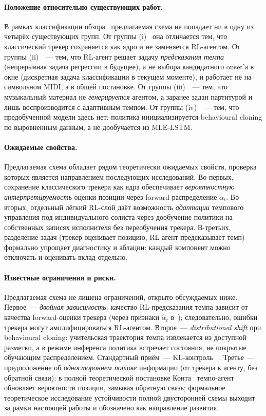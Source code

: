 \paragraph*{Положение относительно существующих работ.} В
рамках классификации обзора~ предлагаемая схема
не попадает ни в одну из четырёх существующих групп. От группы
(i)~\cite{Dorfer2018RL} она отличается тем, что классический
трекер сохраняется как ядро и не заменяется RL-агентом. От
группы (ii)~\cite{Peter2023}~--- тем, что RL-агент решает задачу
\textit{предсказания темпа} (непрерывная задача регрессии в
будущее), а не выбора кандидатного onset’а в окне (дискретная
задача классификации в текущем моменте), и работает не на
символьном MIDI, а в общей постановке. От группы
(iii)~\cite{Jiang2020RLDuet,Wu2024ReaLchords}~--- тем, что
музыкальный материал не \textit{генерируется} агентом, а
заранее задан партитурой и лишь воспроизводится с
адаптивным темпом. От группы (iv)~\cite{Jaques2017SeqTutor}~---
тем, что предобученной модели здесь нет: политика инициализируется
behavioural cloning по выровненным
данным, а не дообучается из MLE-LSTM.

\paragraph*{Ожидаемые свойства.} Предлагаемая схема обладает
рядом теоретически ожидаемых свойств, проверка которых
является направлением последующих исследований. Во-первых,
сохранение классического трекера как ядра обеспечивает
\textit{вероятностную интерпретируемость} оценки позиции через
forward-распределение $\tilde\alpha_t$. Во-вторых, отдельный
лёгкий RL-слой даёт возможность \textit{адаптации} темпового
управления под индивидуального солиста через дообучение
политики на собственных записях исполнителя без
переобучения трекера. В-третьих, разделение задач (трекер
оценивает позицию, RL-агент предсказывает темп) формально
упрощает диагностику и аблации: каждый компонент можно
отключать и оценивать вклад отдельно.

\paragraph*{Известные ограничения и риски.} Предлагаемая схема
не лишена ограничений, открыто обсуждаемых ниже. Первое~---
\textit{двойная зависимость}: качество RL-предсказания темпа
зависит от качества forward-оценки трекера (через признаки
$\hat\alpha_t$ в~); следовательно,
ошибки трекера могут амплифицироваться RL-агентом. Второе~---
\textit{distributional shift} при behavioural cloning: учительская
траектория темпа извлекается из доступной разметки, а в режиме
инференса политика встречает состояния, не покрытые обучающим
распределением. Стандартный приём~--- KL-контроль
~\cite{Jaques2017SeqTutor,Wu2024ReaLchords}.
Третье~--- предположение об \textit{одностороннем потоке}
информации (от трекера к агенту, без обратной связи): в полной
теоретической постановке Конта~\cite{Cont2010} темпо-агент
обновляет вероятности позиции, замыкая обратную связь;
формальное теоретическое исследование устойчивости полной
двусторонней схемы выходит за рамки настоящей работы и
обозначено как направление развития.
